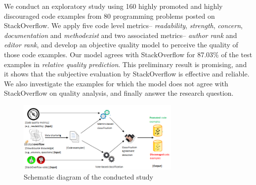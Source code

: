 \documentclass[conference]{IEEEtran}
\begin{document}
We conduct an exploratory study using 160 highly promoted and highly discouraged code examples from 80 programming problems posted on StackOverflow. We apply five code level metrics-- \emph{readability}, \emph{strength}, \emph{concern}, \emph{documentation} and \emph{methodexist} and two associated metrics-- \emph{author rank} and \emph{editor rank}, and develop an objective quality model to perceive the quality of those code examples.  Our model agrees with StackOverflow for 87.03\% of the test examples in \emph{relative quality prediction}.
This preliminary result is promising, and it shows that the subjective evaluation by StackOverflow is effective and reliable.
We also investigate the examples for which the model does not agree with StackOverflow on quality analysis, and finally answer the research question.
\begin{figure}[!t]
\centering
\includegraphics[width=3.1in]{sysdiag}
\vspace{-.2cm}
\caption{Schematic diagram of the conducted study}
\vspace{-.4cm}
\label{fig:sysdiag}
\end{figure}
\vspace{-.2cm}
\end{document}

